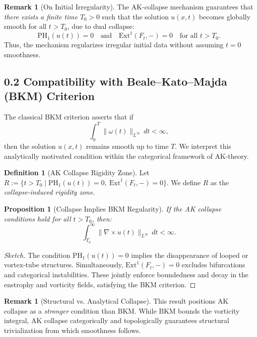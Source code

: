 \documentclass[11pt]{article}
\newtheorem{proposition}[theorem]{Proposition}
\theoremstyle{definition}
\newtheorem{definition}[theorem]{Definition}
\newtheorem{remark}[theorem]{Remark}
\begin{document}
\begin{remark}[On Initial Irregularity]
The AK-collapse mechanism guarantees that \emph{there exists a finite time \( T_0 > 0 \)} such that the solution \( u(x,t) \) becomes globally smooth for all \( t > T_0 \), due to dual collapse:
\[
\mathrm{PH}_1(u(t)) = 0 \quad \text{and} \quad \mathrm{Ext}^1(F_t, -) = 0 \quad \text{for all } t > T_0.
\]
Thus, the mechanism regularizes irregular initial data without assuming \( t = 0 \) smoothness.
\end{remark}

\subsection*{0.2 Compatibility with Beale–Kato–Majda (BKM) Criterion}

The classical BKM criterion asserts that if
\[
\int_0^T \|\omega(t)\|_{L^\infty} \, dt < \infty,
\]
then the solution \( u(x,t) \) remains smooth up to time \( T \). We interpret this analytically motivated condition within the categorical framework of AK-theory.

\begin{definition}[AK Collapse Rigidity Zone]
Let \( R := \{ t > T_0 \mid \mathrm{PH}_1(u(t)) = 0, \ \mathrm{Ext}^1(F_t, -) = 0 \} \).  
We define \( R \) as the \emph{collapse-induced rigidity zone}.
\end{definition}

\begin{proposition}[Collapse Implies BKM Regularity]
If the AK collapse conditions hold for all \( t > T_0 \), then:
\[
\int_{T_0}^{\infty} \|\nabla \times u(t)\|_{L^\infty} \, dt < \infty.
\]
\end{proposition}

\begin{proof}[Sketch]
The condition \( \mathrm{PH}_1(u(t)) = 0 \) implies the disappearance of looped or vortex-tube structures. Simultaneously, \( \mathrm{Ext}^1(F_t, -) = 0 \) excludes bifurcations and categorical instabilities. These jointly enforce boundedness and decay in the enstrophy and vorticity fields, satisfying the BKM criterion.
\end{proof}

\begin{remark}[Structural vs. Analytical Collapse]
This result positions AK collapse as a \emph{stronger} condition than BKM.  
While BKM bounds the vorticity integral, AK collapse categorically and topologically guarantees structural trivialization from which smoothness follows.
\end{remark}
\end{document}
